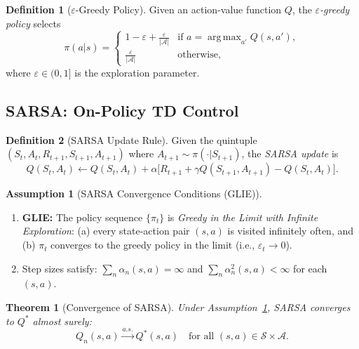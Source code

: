 \documentclass[11pt,a4paper]{article}
\theoremstyle{definition}
\newtheorem{definition}{Definition}[section]
\newtheorem{assumption}{Assumption}[section]
\theoremstyle{plain}
\newtheorem{theorem}{Theorem}[section]
\theoremstyle{remark}
\DeclareMathOperator*{\argmax}{arg\,max}
\begin{document}
\begin{definition}[$\varepsilon$-Greedy Policy]
\label{def:epsilon_greedy}
Given an action-value function $Q$, the \emph{$\varepsilon$-greedy policy} selects
\begin{equation}
    \pi(a|s) = \begin{cases}
    1 - \varepsilon + \frac{\varepsilon}{|\mathcal{A}|} & \text{if } a = \argmax_{a'} Q(s,a'), \\[4pt]
    \frac{\varepsilon}{|\mathcal{A}|} & \text{otherwise,}
    \end{cases}
    \label{eq:epsilon_greedy}
\end{equation}
where $\varepsilon \in (0,1]$ is the exploration parameter.
\end{definition}

\subsection{SARSA: On-Policy TD Control}
\label{subsec:sarsa}

\begin{definition}[SARSA Update Rule]
\label{def:sarsa}
Given the quintuple $(S_t, A_t, R_{t+1}, S_{t+1}, A_{t+1})$ where $A_{t+1} \sim \pi(\cdot|S_{t+1})$, the \emph{SARSA update} is
\begin{equation}
    Q(S_t, A_t) \leftarrow Q(S_t, A_t) + \alpha\bigl[R_{t+1} + \gamma Q(S_{t+1}, A_{t+1}) - Q(S_t, A_t)\bigr].
    \label{eq:sarsa}
\end{equation}
\end{definition}

\begin{assumption}[SARSA Convergence Conditions (GLIE)]
\label{ass:sarsa}
\begin{enumerate}[nosep]
    \item \textbf{GLIE:} The policy sequence $\{\pi_t\}$ is \emph{Greedy in the Limit with Infinite Exploration}: (a) every state-action pair $(s,a)$ is visited infinitely often, and (b) $\pi_t$ converges to the greedy policy in the limit (i.e., $\varepsilon_t \to 0$).
    \item Step sizes satisfy: $\sum_{n} \alpha_n(s,a) = \infty$ and $\sum_{n} \alpha_n^2(s,a) < \infty$ for each $(s,a)$.
\end{enumerate}
\end{assumption}

\begin{theorem}[Convergence of SARSA]
\label{thm:sarsa_convergence}
Under Assumption~\ref{ass:sarsa}, SARSA converges to $Q^*$ almost surely:
\begin{equation}
    Q_n(s,a) \xrightarrow{a.s.} Q^*(s,a) \quad \text{for all } (s,a) \in \mathcal{S} \times \mathcal{A}.
\end{equation}
\end{theorem}
\end{document}
